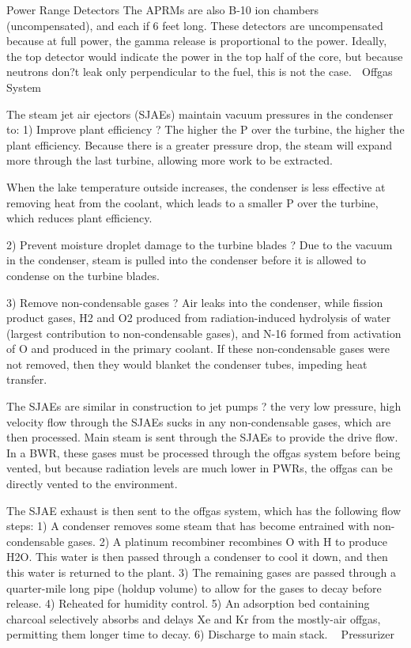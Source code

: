 \documentclass[10pt]{article}
\begin{document}
Power Range Detectors
The APRMs are also B-10 ion chambers (uncompensated), and each if 6 feet long. These detectors are uncompensated because at full power, the gamma release is proportional to the power. Ideally, the top detector would indicate the power in the top half of the core, but because neutrons don?t leak only perpendicular to the fuel, this is not the case. 
Offgas System

The steam jet air ejectors (SJAEs) maintain vacuum pressures in the condenser to:
1)	Improve plant efficiency ? The higher the P over the turbine, the higher the plant efficiency. Because there is a greater pressure drop, the steam will expand more through the last turbine, allowing more work to be extracted. 



When the lake temperature outside increases, the condenser is less effective at removing heat from the coolant, which leads to a smaller P over the turbine, which reduces plant efficiency. 

2)	Prevent moisture droplet damage to the turbine blades ? Due to the vacuum in the condenser, steam is pulled into the condenser before it is allowed to condense on the turbine blades. 

3)	Remove non-condensable gases ? Air leaks into the condenser, while fission product gases, H2 and O2 produced from radiation-induced hydrolysis of water (largest contribution to non-condensable gases), and N-16 formed from activation of O and produced in the primary coolant. If these non-condensable gases were not removed, then they would blanket the condenser tubes, impeding heat transfer. 

The SJAEs are similar in construction to jet pumps ? the very low pressure, high velocity flow through the SJAEs sucks in any non-condensable gases, which are then processed. Main steam is sent through the SJAEs to provide the drive flow. In a BWR, these gases must be processed through the offgas system before being vented, but because radiation levels are much lower in PWRs, the offgas can be directly vented to the environment. 

The SJAE exhaust is then sent to the offgas system, which has the following flow steps:
1)	A condenser removes some steam that has become entrained with non-condensable gases. 
2)	A platinum recombiner recombines O with H to produce H2O. This water is then passed through a condenser to cool it down, and then this water is returned to the plant. 
3)	The remaining gases are passed through a quarter-mile long pipe (holdup volume) to allow for the gases to decay before release. 
4)	Reheated for humidity control.
5)	An adsorption bed containing charcoal selectively absorbs and delays Xe and Kr from the mostly-air offgas, permitting them longer time to decay. 
6)	Discharge to main stack.

Pressurizer
\end{document}
